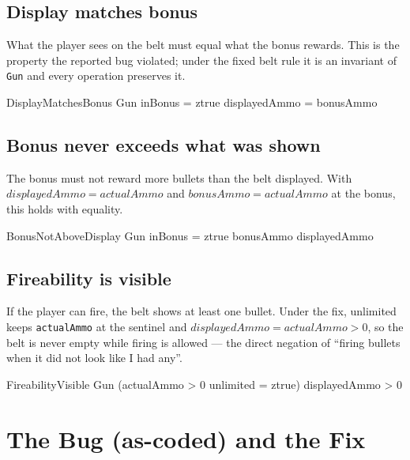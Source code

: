\documentclass[a4paper,10pt,fleqn]{article}
\begin{document}
\subsection{Display matches bonus}

What the player sees on the belt must equal what the bonus rewards.
This is the property the reported bug violated; under the fixed belt
rule it is an invariant of \texttt{Gun} and every operation preserves
it.

\begin{schema}{DisplayMatchesBonus}
Gun
\where
inBonus = ztrue \implies displayedAmmo = bonusAmmo
\end{schema}

\subsection{Bonus never exceeds what was shown}

The bonus must not reward more bullets than the belt displayed.  With
$displayedAmmo = actualAmmo$ and $bonusAmmo = actualAmmo$ at the bonus,
this holds with equality.

\begin{schema}{BonusNotAboveDisplay}
Gun
\where
inBonus = ztrue \implies bonusAmmo \leq displayedAmmo
\end{schema}

\subsection{Fireability is visible}

If the player can fire, the belt shows at least one bullet.  Under the
fix, unlimited keeps \texttt{actualAmmo} at the sentinel and
$displayedAmmo = actualAmmo > 0$, so the belt is never empty while
firing is allowed --- the direct negation of ``firing bullets when it
did not look like I had any''.

\begin{schema}{FireabilityVisible}
Gun
\where
(actualAmmo > 0 \lor unlimited = ztrue) \implies displayedAmmo > 0
\end{schema}

\section{The Bug (as-coded) and the Fix}
\label{sec:bug}
\end{document}
